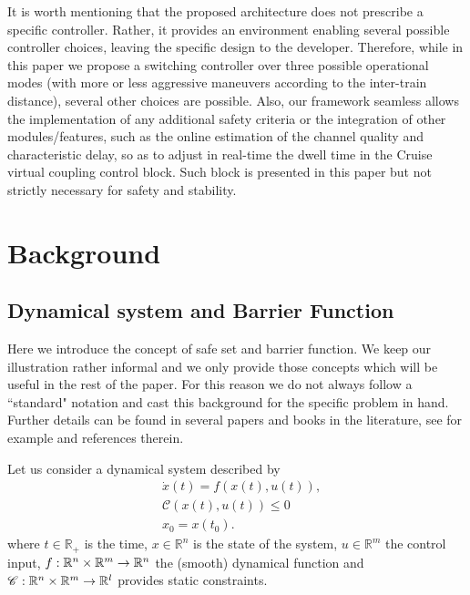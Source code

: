 \documentclass[letterpaper, 10 pt, conference]{ieeeconf}
\theoremstyle{definition}
\theoremstyle{nopoint}
\begin{document}
It is worth mentioning that the proposed architecture does not prescribe a specific controller. Rather, it provides an environment enabling several possible controller choices, leaving the specific design to the developer. 
Therefore, while in this paper we propose a switching controller over three possible operational modes (with more or less aggressive maneuvers according to the inter-train distance), several other choices are possible. 
Also, our framework seamless allows the implementation of any additional safety criteria or the integration of other modules/features, such as the online estimation of the channel quality and characteristic delay, so as to adjust in real-time the dwell time in the Cruise virtual coupling control block. Such block is presented in this paper but not strictly necessary for safety and stability. 






\section{Background}
 \label{sec:Background}
 





\subsection{Dynamical system and Barrier Function}
\label{subsec:barrier}

Here we introduce the concept of safe set and barrier function. We keep our illustration rather informal and we only provide those concepts which will be useful in the rest of the paper. For this reason we do not always follow a ``standard" notation and cast this background for the specific problem in hand.  Further details can be found in several papers and books in the literature, see for example \cite{belta} and references therein. 


Let us consider a dynamical system described by 
\begin{subequations}\label{eq:dynamical_system}
\begin{align}
	& \dot{x}(t) = f(x(t), u(t)), \label{eq:dynamics}\\
	& \mathcal{C}(x(t),u(t))\leq 0 \label{eq:constraints}\\
	& x_0=x(t_0). \label{eq:initial_condition}
\end{align}
\end{subequations}
where $t \in \mathbb{R}_+
$ is the time, \(x \in \mathbb{R}^n\) is the state of the system, \(u \in \mathbb{R}^m\) the control input, $f: \Bbb{R}^n \times\Bbb{R}^m \rightarrow \Bbb{R}^n $ the (smooth) dynamical function and $\mathcal{C}: \Bbb{R}^n \times\Bbb{R}^m \rightarrow \Bbb{R}^l$ provides static constraints. 
\end{document}
